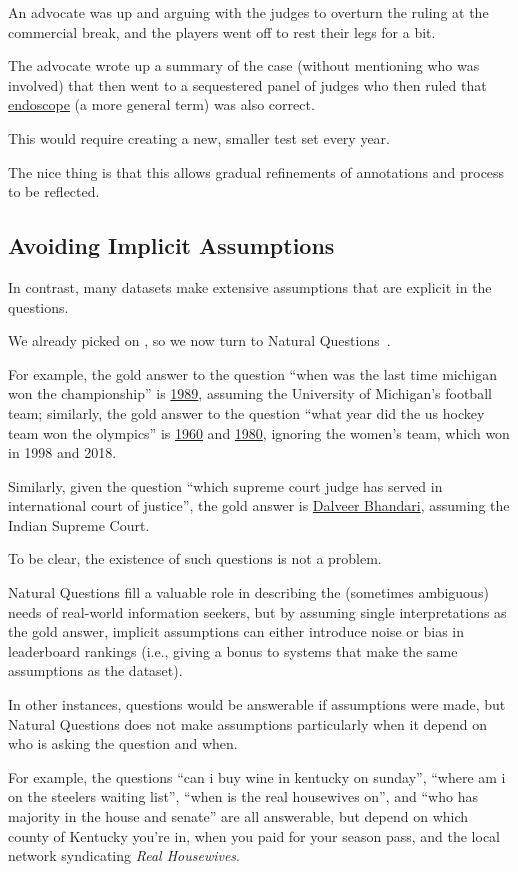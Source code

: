 An advocate was up and arguing with the
judges to overturn the ruling at the commercial break, and the players went off to rest their legs for a bit.

The advocate wrote up a summary of the case (without mentioning who was
involved) that then went to a sequestered panel of judges who then
ruled that \underline{endoscope} (a more general term) was also correct.

This would require creating a new, smaller test set every year.

The nice thing is that this allows gradual refinements of annotations
and process to be reflected.

\subsection{Avoiding Implicit Assumptions}

In contrast, many datasets make extensive assumptions that are explicit in the questions.

We already picked on \squad{}, so we now turn to Natural Questions~\cite{kwiatkowski-19}.

For example, the gold answer to the question ``when was the last time michigan won the championship'' is \underline{1989}, assuming the University of Michigan's football team; similarly, the gold answer to the question ``what year did the us hockey team won the olympics'' is \underline{1960} and \underline{1980}, ignoring the  women's team, which won in 1998 and 2018.

Similarly, given the question ``which supreme court judge has served in international court of justice'', the gold answer is \underline{Dalveer Bhandari}, assuming the Indian Supreme Court.

To be clear, the existence of such questions is not a problem.

Natural Questions fill a valuable role in describing the (sometimes ambiguous) needs of real-world information seekers, but by assuming single interpretations as the gold answer, implicit assumptions can either introduce noise or bias in leaderboard rankings (i.e., giving a bonus to systems that make the same assumptions as the dataset).


In other instances, questions would be answerable if assumptions were made, but Natural Questions does not make assumptions particularly when it depend on who is asking the question and when.

For example, the questions ``can i buy wine in kentucky on sunday'', ``where am i on the steelers waiting list'', ``when is the real housewives on'', and ``who has majority in the house and senate'' are all answerable, but depend on which county of Kentucky you're in,
  when you paid for your season pass, and the local network
  syndicating \textit{Real Housewives}.

